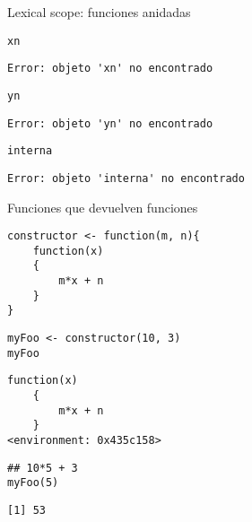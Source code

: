 \documentclass[xcolor={usenames,svgnames,dvipsnames}]{beamer}
\begin{document}
\begin{frame}[fragile,label={sec:orgheadline16}]{Lexical scope: funciones anidadas}
 \lstset{language=R,label= ,caption= ,captionpos=b,numbers=none}
\begin{lstlisting}
xn
\end{lstlisting}

\begin{verbatim}
Error: objeto 'xn' no encontrado
\end{verbatim}

\lstset{language=R,label= ,caption= ,captionpos=b,numbers=none}
\begin{lstlisting}
yn
\end{lstlisting}

\begin{verbatim}
Error: objeto 'yn' no encontrado
\end{verbatim}

\lstset{language=R,label= ,caption= ,captionpos=b,numbers=none}
\begin{lstlisting}
interna
\end{lstlisting}

\begin{verbatim}
Error: objeto 'interna' no encontrado
\end{verbatim}
\end{frame}

\begin{frame}[fragile,label={sec:orgheadline17}]{Funciones que devuelven funciones}
 \lstset{language=R,label= ,caption= ,captionpos=b,numbers=none}
\begin{lstlisting}
constructor <- function(m, n){
    function(x)
    {
        m*x + n
    }
}
\end{lstlisting}

\lstset{language=R,label= ,caption= ,captionpos=b,numbers=none}
\begin{lstlisting}
myFoo <- constructor(10, 3)
myFoo
\end{lstlisting}

\begin{verbatim}
function(x)
    {
        m*x + n
    }
<environment: 0x435c158>
\end{verbatim}

\lstset{language=R,label= ,caption= ,captionpos=b,numbers=none}
\begin{lstlisting}
## 10*5 + 3
myFoo(5)
\end{lstlisting}

\begin{verbatim}
[1] 53
\end{verbatim}
\end{frame}
\end{document}
